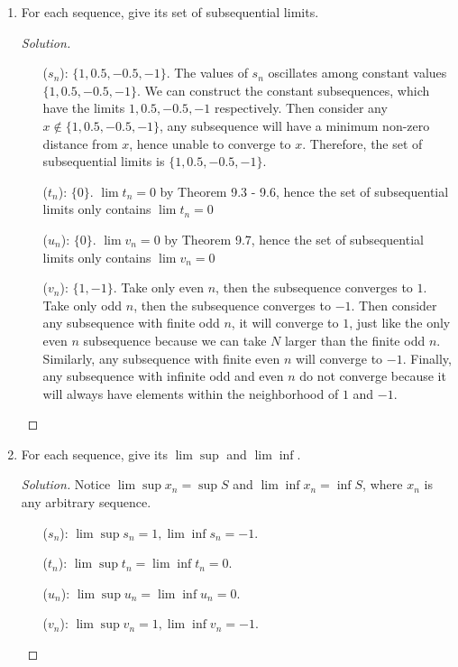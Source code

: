 \documentclass{article}
\begin{document}
\begin{enumerate}[label=(\alph*)]
\begin{proof}[Solution]
    \end{proof}
    \item For each sequence, give its set of subsequential limits.
    \begin{proof}[Solution]\indent
        \begin{enumerate}
            \item[($s_n$):] $\{1, 0.5, -0.5, -1\}$. The values of $s_n$ oscillates among constant values
            $\{1, 0.5, -0.5, -1\}$. We can construct the constant subsequences, which have the limits 
            $1, 0.5, -0.5, -1$ respectively. Then consider any $x\not\in\{1, 0.5, -0.5, -1\}$, 
            any subsequence will have a minimum non-zero distance from $x$, hence unable to converge 
            to $x$. Therefore, the set of subsequential limits is $\{1, 0.5, -0.5, -1\}$.
            \item[($t_n$):] $\{0\}$. $\lim t_n=0$ by Theorem 9.3 - 9.6, hence the set of 
            subsequential limits only contains $\lim t_n=0$
            \item[($u_n$):] $\{0\}$. $\lim v_n=0$ by Theorem 9.7, hence the set of subsequential 
            limits only contains $\lim v_n=0$
            \item[($v_n$):] $\{1, -1\}$. Take only even $n$, then the subsequence converges to $1$.
            Take only odd $n$, then the subsequence converges to $-1$. Then consider any 
            subsequence with finite odd $n$, it will converge to $1$, just like the only even $n$ 
            subsequence because we can take $N$ larger than the finite odd $n$. Similarly, any
            subsequence with finite even $n$ will converge to $-1$. Finally, any subsequence 
            with infinite odd and even $n$ do not converge because it will always have elements 
            within the neighborhood of $1$ and $-1$. 
        \end{enumerate}
    \end{proof}

    \item For each sequence, give its $\lim \sup$ and $\lim \inf$.
    \begin{proof}[Solution]\indent
        Notice $\lim \sup x_n = \sup S$ and $\lim \inf x_n = \inf S$, where $x_n$ is any arbitrary 
        sequence.
        \begin{enumerate}
            \item[($s_n$):] $\lim \sup s_n = 1, \lim \inf s_n = -1$. 
            \item[($t_n$):] $\lim \sup t_n = \lim \inf t_n = 0$.
            \item[($u_n$):] $\lim \sup u_n = \lim \inf u_n = 0$.
            \item[($v_n$):] $\lim \sup v_n=1, \lim\inf v_n=-1$. 
        \end{enumerate}
    \end{proof}


\end{enumerate}
\end{document}
